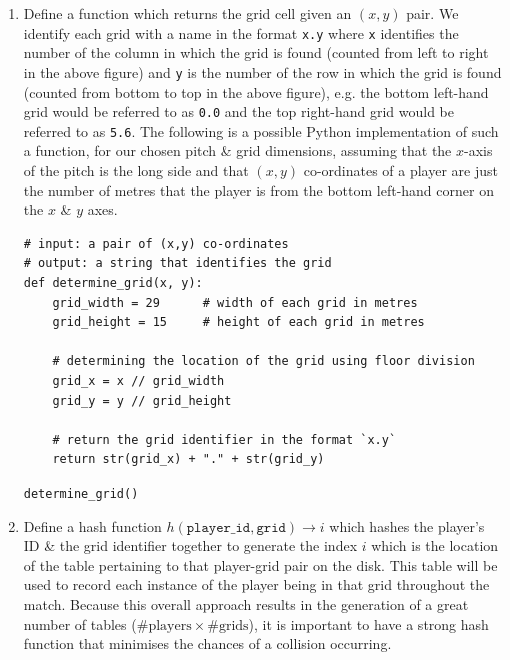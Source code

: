 \documentclass[a4paper,11pt]{article}
\newenvironment{code}{\captionsetup{type=listing}}{}
\begin{document}
\begin{enumerate}
    \item   Define a function which returns the grid cell given an $(x,y)$ pair. 
    We identify each grid with a name in the format \verb|x.y| where \verb|x| identifies the number of the column in which the grid is found (counted from left to right in the above figure) and \verb|y| is the number of the row in which the grid is found (counted from bottom to top in the above figure), e.g. the bottom left-hand grid would be referred to as \verb|0.0| and the top right-hand grid would be referred to as \verb|5.6|.
    The following is a possible Python implementation of such a function, for our chosen pitch \& grid dimensions, assuming that the $x$-axis of the pitch is the long side and that $(x,y)$ co-ordinates of a player are just the number of metres that the player is from the bottom left-hand corner on the $x$ \& $y$ axes. 
\begin{code}
\begin{verbatim}
# input: a pair of (x,y) co-ordinates 
# output: a string that identifies the grid
def determine_grid(x, y):
    grid_width = 29      # width of each grid in metres
    grid_height = 15     # height of each grid in metres

    # determining the location of the grid using floor division
    grid_x = x // grid_width 
    grid_y = y // grid_height 
    
    # return the grid identifier in the format `x.y`
    return str(grid_x) + "." + str(grid_y)
\end{verbatim}
\caption{\texttt{determine\_grid()}}
\end{code}

    \item  Define a hash function $h(\texttt{player\_id}, \texttt{grid}) \rightarrow i$ which hashes the player's ID \& the grid identifier together to generate the index $i$ which is the location of the table pertaining to that player-grid pair on the disk.
            This table will be used to record each instance of the player being in that grid throughout the match. 
            Because this overall approach results in the generation of a great number of tables ($\# \text{players} \times \# \text{grids}$), it is important to have a strong hash function that minimises the chances of a collision occurring. 


\end{enumerate}
\end{document}
